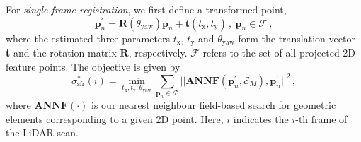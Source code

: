 \documentclass[letterpaper, 10 pt, conference]{ieeeconf}  %
\begin{document}
For \textit{single-frame registration}, we first define a transformed point,
%
\begin{equation}
    \mathbf{p}_n^{\prime} = \textbf{R}(\theta_{\text{yaw}})\mathbf{p}_n + \textbf{t}(t_\text{x}, t_\text{y}) \,, \ \mathbf{p}_n \in \mathcal{F} \,,
\end{equation}
where the estimated three parameters $t_\text{x}$, $t_\text{y}$ and $\theta_{\text{yaw}}$ form the translation vector \textbf{t} and the rotation matrix $\textbf{R}$, respectively. $\mathcal{F}$ refers to the set of all projected 2D feature points. The objective is given by
%
\begin{equation}
    \sigma^*_{\text{sfr}}(i) = 
    \min_{t_\text{x}, t_\text{y}, \theta_{\text{yaw}}} \sum_{\mathbf{p}_n \in \mathcal{F}}
    || \textbf{ANNF}(\mathbf{p}_n^{\prime}, \mathcal{E}_M), \mathbf{p}_n^{\prime} ||^2 \,,
\end{equation}
%
where $\textbf{ANNF}(\cdot)$ is our nearest neighbour field-based search for geometric elements corresponding to a given 2D point. Here, $i$ indicates the $i$-th frame of the LiDAR scan.
\end{document}
